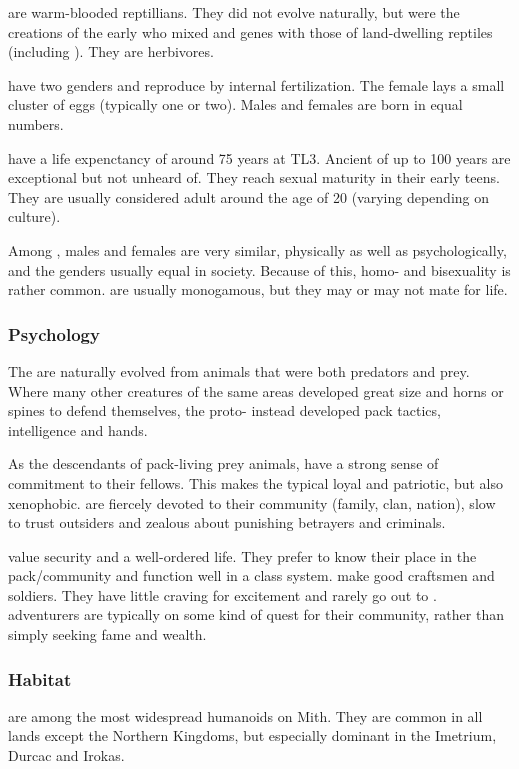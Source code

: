 \Scathae{} are warm-blooded reptillians. They did not evolve naturally, but were the creations of the early \dragonlords{} who mixed \dragon{} and \naga{} genes with those of land-dwelling reptiles (including \nycans{}). They are herbivores. 

\Scathae{} have two genders and reproduce by internal fertilization. The female lays a small cluster of eggs (typically one or two). Males and females are born in equal numbers. 

\Scathae{} have a life expenctancy of around 75 years at TL3. Ancient \scathae{} of up to 100 years are exceptional but not unheard of. They reach sexual maturity in their early teens. They are usually considered adult around the age of 20 (varying depending on culture). 

Among \scathae{}, males and females are very similar, physically as well as psychologically, and the genders usually equal in society. Because of this, homo- and bisexuality is rather common. \Scathae{} are usually monogamous, but they may or may not mate for life.  

\subsubsection{Psychology}
The \scathae{} are naturally evolved from animals that were both predators and prey. Where many other creatures of the same areas developed great size and horns or spines to defend themselves, the proto-\scathae{} instead developed pack tactics, intelligence and hands. 

As the descendants of pack-living prey animals, \scathae{} have a strong sense of commitment to their fellows. This makes the typical \scatha{} loyal and patriotic, but also xenophobic. \Scathae{} are fiercely devoted to their community (family, clan, nation), slow to trust outsiders and zealous about punishing betrayers and criminals. 

\Scathae{} value security and a well-ordered life. They prefer to know their place in the pack/community and function well in a class system. \Scathae{} make good craftsmen and soldiers. They have little craving for excitement and rarely go out to . \Scathaese{} adventurers are typically on some kind of quest for their community, rather than simply seeking fame and wealth. 

\subsubsection{Habitat}
\Scathae{} are among the most widespread humanoids on Mith. They are common in all lands except the Northern Kingdoms, but especially dominant in the Imetrium, Durcac and Irokas. 

